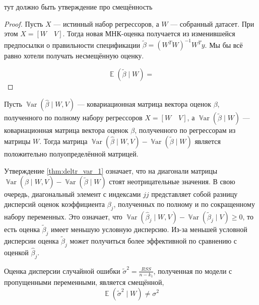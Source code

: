 \documentclass[12pt]{article}
\DeclareMathOperator{\Var}{\mathbb{V}ar}
\DeclareMathOperator{\E}{\mathbb{E}}
\newcommand{\hb}{\hat{\beta}}
\newcommand{\tb}{\tilde{\beta}}
\newcommand{\RSS}{RSS}
\begin{document}
\begin{lemma}
тут должно быть утверждение про смещённость 
\end{lemma}

\begin{proof}
Пусть $X$ — истинный набор регрессоров, а $W$ — собранный датасет. 
При этом $X = [W \quad V]$. Тогда новая МНК-оценка получается из изменившейся предпосылки о правильности спецификации $\tb = (W^T W)^{-1}W^T y$. Мы бы всё равно хотели получать несмещённую оценку.

\[ \E(\tb \mid W) =  \]

\end{proof}

\begin{lemma}
\label{thm:deltr_var_1}
Пусть $\Var(\hb \mid W, V)$ — ковариационная матрица вектора оценок $\beta$, полученного по полному набору регрессоров $X = [W \quad V]$, а $\Var(\tb \mid W)$ — ковариационная матрица вектора оценок $\beta$, полученного по регрессорам  из матрицы $W$. Тогда матрица $\Var(\hb \mid W, V) - \Var(\tb \mid W)$ является положительно полуопределённой матрицей.
\end{lemma}

Утверждение \ref{thm:deltr_var_1} означает, что на диагонали матрицы $\Var(\hb \mid W, V) - \Var(\tb \mid W)$ стоят неотрицательные значения. 
В свою очередь, диагональный элемент с индексами ${jj}$ представляет собой разницу дисперсий оценок коэффициента $\beta_j$, полученных по полному и по сокращенному набору переменных. 
Это означает, что $\Var(\hb_j \mid W, V) - \Var(\tb_j \mid V) \geq 0$, то есть оценка $\tb_j$ имеет меньшую условную дисперсию. 
Из-за меньшей условной дисперсии оценка $\tb_j$ может получиться более эффективной по сравнению с оценкой $\hb_j$.

\begin{lemma}
    Оценка дисперсии случайной ошибки $\tilde\sigma^2 = \frac{\RSS}{n-k_1}$, полученная по модели с пропущенными переменными, является смещённой,
    \[
    \E(\tilde\sigma^2 \mid W)  \neq \sigma^2
    \]
\end{lemma}
\end{document}
